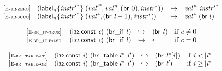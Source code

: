 $$
\begin{array}{@{}l@{}lcl@{}l@{}}
{[\textsc{\scriptsize E{-}br{-}zero}]} \quad & ({{\mathsf{label}}_{{\mathit{n}}}}{\{{{\mathit{instr}'}^\ast}\}}~({{\mathit{val}'}^\ast}, {{\mathit{val}}^{{\mathit{n}}}}, (\mathsf{br}~0), {{\mathit{instr}}^\ast})) &\hookrightarrow& {{\mathit{val}}^{{\mathit{n}}}}~{{\mathit{instr}'}^\ast} &  \\
{[\textsc{\scriptsize E{-}br{-}succ}]} \quad & ({{\mathsf{label}}_{{\mathit{n}}}}{\{{{\mathit{instr}'}^\ast}\}}~({{\mathit{val}}^\ast}, (\mathsf{br}~{\mathit{l}} + 1), {{\mathit{instr}}^\ast})) &\hookrightarrow& {{\mathit{val}}^\ast}~(\mathsf{br}~{\mathit{l}}) &  \\
\end{array}
$$

\vspace{1ex}

$$
\begin{array}{@{}l@{}lcl@{}l@{}}
{[\textsc{\scriptsize E{-}br\_if{-}true}]} \quad & (\mathsf{i{\scriptstyle32}}.\mathsf{const}~{\mathit{c}})~(\mathsf{br\_if}~{\mathit{l}}) &\hookrightarrow& (\mathsf{br}~{\mathit{l}}) &\quad
  \mbox{if}~{\mathit{c}} \neq 0 \\
{[\textsc{\scriptsize E{-}br\_if{-}false}]} \quad & (\mathsf{i{\scriptstyle32}}.\mathsf{const}~{\mathit{c}})~(\mathsf{br\_if}~{\mathit{l}}) &\hookrightarrow& \epsilon &\quad
  \mbox{if}~{\mathit{c}} = 0 \\
\end{array}
$$

\vspace{1ex}

$$
\begin{array}{@{}l@{}lcl@{}l@{}}
{[\textsc{\scriptsize E{-}br\_table{-}lt}]} \quad & (\mathsf{i{\scriptstyle32}}.\mathsf{const}~{\mathit{i}})~(\mathsf{br\_table}~{{\mathit{l}}^\ast}~{\mathit{l}'}) &\hookrightarrow& (\mathsf{br}~{{\mathit{l}}^\ast}{}[{\mathit{i}}]) &\quad
  \mbox{if}~{\mathit{i}} < {|{{\mathit{l}}^\ast}|} \\
{[\textsc{\scriptsize E{-}br\_table{-}ge}]} \quad & (\mathsf{i{\scriptstyle32}}.\mathsf{const}~{\mathit{i}})~(\mathsf{br\_table}~{{\mathit{l}}^\ast}~{\mathit{l}'}) &\hookrightarrow& (\mathsf{br}~{\mathit{l}'}) &\quad
  \mbox{if}~{\mathit{i}} \geq {|{{\mathit{l}}^\ast}|} \\
\end{array}
$$

\vspace{1ex}

